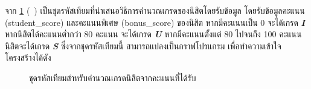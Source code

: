 จาก{\figurename} \ref{fig:pseudocodeGrading} (\pagename\ \pageref{fig:pseudocodeGrading}) 
เป็นชุดรหัสเทียมที่นำเสนอวิธีการคำนวณเกรดของนิสิตโดยรับข้อมูล โดยรับข้อมูลคะแนน (student\_score) และคะแนนพิเศษ (bonus\_score) 
ของนิสิต หากมีคะแนนเป็น 0 จะได้เกรด \emph{{\bf I}} หากนิสิตได้คะแนนต่ำกว่า 80 คะแนน จะได้เกรด {\emph{\bf U}} หากมีคะแนนตั้งแต่ 80 
ไปจนถึง 100 คะแนน นิสิตจะได้เกรด {\emph{\bf S}} ซึ่งจากชุดรหัสเทียมนี้ สามารถแปลงเป็นกราฟโปรแกรม เพื่อทำความเข้าใจโครงสร้างได้ดัง{ 

\begin{figure}[ht!]
    \begin{algorithm}[H]
        \begin{algorithmic}[1]

                \ENDIF
            \ENDIF


            \ENDIF

        \end{algorithmic}
    \end{algorithm}
    \caption{ชุดรหัสเทียมสำหรับคำนวณเกรดนิสิตจากคะแนนที่ได้รับ}
    \label{fig:pseudocodeGrading}
\end{figure}


}
